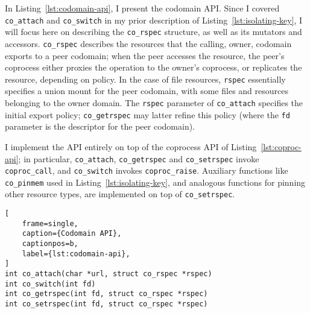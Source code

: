 %
In Listing~\ref{lst:codomain-api}, I present the codomain API\@.
%
Since I covered \texttt{co\_attach} and \texttt{co\_switch} in my prior
description of Listing~\ref{lst:isolating-key}, I will focus here on describing
the \texttt{co\_rspec} structure, as well as its mutators and accessors.
%
\texttt{co\_rspec} describes the resources that the calling, owner, codomain
exports to a peer codomain; when the peer accesses the resource, the peer's
coprocess either proxies the operation to the owner's coprocess, or replicates
the resource, depending on policy.
%
In the case of file resources, \texttt{rspec} essentially specifies a union
mount for the peer codomain, with some files and resources belonging to the
owner domain.
%
The \texttt{rspec} parameter of \texttt{co\_attach} specifies the initial
export policy; \texttt{co\_getrspec} may latter refine this policy (where
the \texttt{fd} parameter is the descriptor for the peer codomain).


I implement the API entirely on top of the coprocess API of
Listing~\ref{lst:coproc-api}; in particular, \texttt{co\_attach},
\texttt{co\_getrspec} and \texttt{co\_setrspec} invoke \texttt{coproc\_call},
and \texttt{co\_switch} invokes \texttt{coproc\_raise}.
%
Auxiliary functions like \texttt{co\_pinmem} used in
Listing~\ref{lst:isolating-key}, and analogous functions for pinning other
resource types, are implemented on top of \texttt{co\_setrspec}.

\begin{lstlisting}[
    frame=single,
    caption={Codomain API},
    captionpos=b,
    label={lst:codomain-api},
]
int co_attach(char *url, struct co_rspec *rspec)
int co_switch(int fd)
int co_getrspec(int fd, struct co_rspec *rspec)
int co_setrspec(int fd, struct co_rspec *rspec)
\end{lstlisting}

%

